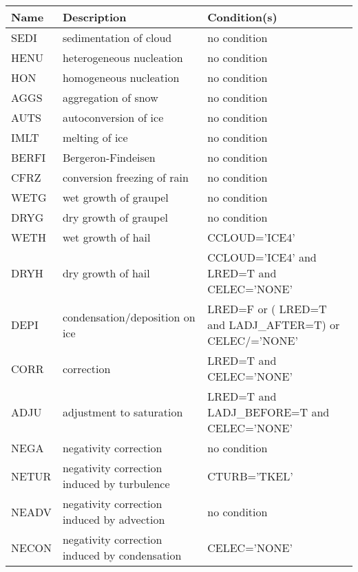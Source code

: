 \begin{longtable} {|p{}|p{}|p{}|}
\hline
Name & Description & Condition(s) \\
\hline \hline
\endhead
SEDI   & sedimentation of cloud                        & no condition \\\hline
HENU   & heterogeneous nucleation                      & no condition \\\hline
HON    & homogeneous nucleation                        & no condition \\\hline
AGGS   & aggregation of snow                           & no condition \\\hline
AUTS   & autoconversion of ice                         & no condition \\\hline
IMLT   & melting of ice                                & no condition \\\hline
BERFI  & Bergeron-Findeisen                            & no condition \\\hline
CFRZ   & conversion freezing of rain                   & no condition \\\hline
WETG   & wet growth of graupel                         & no condition \\\hline
DRYG   & dry growth of graupel                         & no condition \\\hline
WETH   & wet growth of hail                            & CCLOUD='ICE4' \\\hline
DRYH   & dry growth of hail                            & CCLOUD='ICE4' and LRED=T and CELEC='NONE' \\\hline
DEPI   & condensation/deposition on ice                & LRED=F or ( LRED=T and LADJ\_AFTER=T) or CELEC/='NONE' \\\hline
CORR   & correction                                    & LRED=T and CELEC='NONE' \\\hline
ADJU   & adjustment to saturation                      & LRED=T and LADJ\_BEFORE=T and CELEC='NONE' \\\hline
NEGA   & negativity correction                         & no condition \\\hline
NETUR  & negativity correction induced by turbulence   & CTURB='TKEL' \\\hline
NEADV  & negativity correction induced by advection    & no condition \\\hline
NECON  & negativity correction induced by condensation & CELEC='NONE' \\\hline
\end{longtable}


